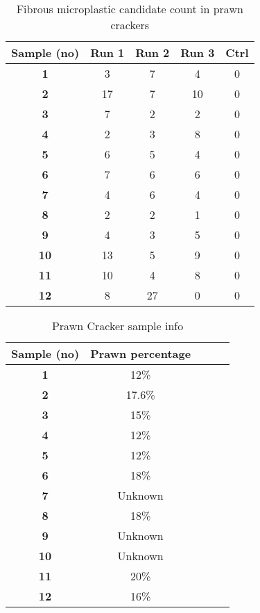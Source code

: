 \documentclass[11pt]{article}
\begin{document}
    \begin{table}[htbp]
        \centering
        \caption{Fibrous microplastic candidate count in prawn crackers}
        \label{table:fibmicplascount}
        \begin{tabular}{>{\bfseries}ccccc}
            \hline
            Sample (no) & Run 1 & Run 2 & Run 3 & Ctrl\\
            \hline
            1 & 3 & 7 & 4 & 0 \\
            2 & 17 & 7 & 10 & 0 \\
            3 & 7 & 2 & 2 & 0 \\
            4 & 2 & 3 & 8 & 0 \\
            5 & 6 & 5 & 4 & 0 \\
            6 & 7 & 6 & 6 & 0 \\
            7 & 4 & 6 & 4 & 0 \\
            8 & 2 & 2 & 1 & 0 \\
            9 & 4 & 3 & 5 & 0 \\
            10 & 13 & 5 & 9 & 0 \\
            11 & 10 & 4 & 8 & 0 \\
            12 & 8 & 27 & 0 & 0 \\
        \end{tabular}
    \end{table}

    \begin{table}[htbp]
        \centering
        \caption{Prawn Cracker sample info}
        \label{table:crackersampleinfo}
        \begin{tabular}{>{\bfseries}ccccc}
            \hline
            Sample (no) & Prawn percentage\\
            \hline
            1 & 12\% \\
            2 & 17.6\% \\
            3 & 15\% \\
            4 & 12\% \\
            5 & 12\% \\
            6 & 18\% \\
            7 & Unknown \\
            8 & 18\% \\
            9 & Unknown \\
            10 & Unknown \\
            11 & 20\% \\
            12 & 16\% \\
        \end{tabular}
    \end{table}

    \clearpage
    
    
\end{document}
